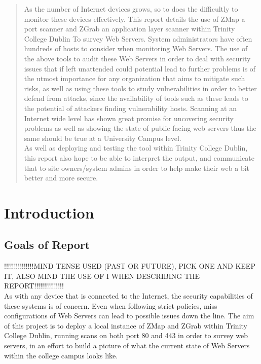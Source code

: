 \documentclass[a4wide,leqno,12pt]{report}
\begin{document}
\begin{abstract}
\noindent
As the number of Internet devices grows, so to does the difficultly to monitor these devices effectively. This report details the use of ZMap a port scanner and ZGrab an application layer scanner within Trinity College Dublin To survey Web Servers. System administrators have often hundreds of hosts to consider when monitoring Web Servers. The use of the above tools to audit these Web Servers in order to deal with security issues that if left unattended could potential lead to further problems is of the utmost importance for any organization that aims to mitigate such risks, as well as using these tools to study vulnerabilities in order to better defend from attacks, since the availability of tools such as these leads to the potential of attackers finding vulnerability hosts. Scanning at an Internet wide level has shown great promise for uncovering security problems as well as showing the state of public facing web servers  \cite{durumeric2015search} thus the same should be true at a University Campus level.\\

As well as deploying and testing the tool within Trinity College Dublin, this report also hope to be able to interpret the output, and communicate that to site owners/system admins in order to help make their web a bit better and more secure.

\end{abstract}


\chapter{Introduction}
\section{Goals of Report}
!!!!!!!!!!!!!!!MIND TENSE USED (PAST OR FUTURE), PICK ONE AND KEEP IT, ALSO MIND THE USE OF I WHEN DESCRIBING THE REPORT!!!!!!!!!!!!!!!\\



As with any device that is connected to the Internet, the  security capabilities of these systems is of concern. Even when following strict policies,  miss configurations of Web Servers can lead to possible issues down the line. The aim of this project is to deploy a local instance of ZMap and ZGrab within Trinity College Dublin, running scans on both port 80 and 443 in order to survey web servers, in an effort to build a picture of what the current state of Web Servers within the college campus looks like.\\
\end{document}
